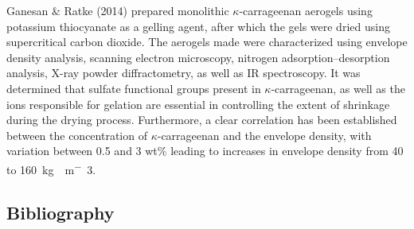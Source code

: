 \documentclass[a4paper,12pt]{article}
\begin{document}
Ganesan \& Ratke (2014) prepared monolithic $\kappa$-carrageenan aerogels using potassium thiocyanate as a gelling agent, after which the gels were dried using supercritical carbon dioxide. The aerogels made were characterized using envelope density analysis, scanning electron microscopy, nitrogen adsorption–desorption analysis, X-ray powder diffractometry, as well as IR spectroscopy. It was determined that sulfate functional groups present in $\kappa$-carrageenan, as well as the ions responsible for gelation are essential in controlling the extent of shrinkage during the drying process. Furthermore, a clear correlation has been established between the concentration of $\kappa$-carrageenan and the envelope density, with variation between 0.5 and 3 wt\% leading to increases in envelope density from 40 to \SI{160}{kg\cdot m^-3}.\supercite{ganesan_facile_2014}

\begin{center}
  \section{Bibliography}
\end{center}


\printbibliography
\end{document}
